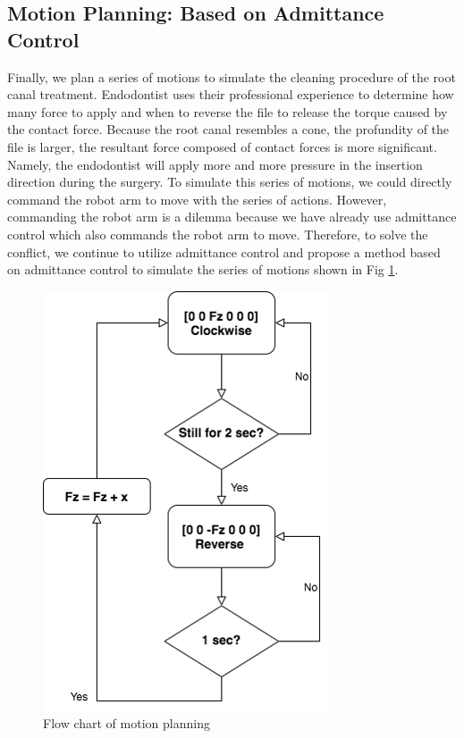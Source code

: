 \subsection{Motion Planning: Based on Admittance Control}
\label{sec:motion planning} 
Finally, we plan a series of motions to simulate the cleaning procedure of the root canal treatment. Endodontist uses their professional experience to determine how many force to apply and when to reverse the file to release the torque caused by the contact force. Because the root canal resembles a cone, the profundity of the file is larger, the resultant force composed of contact forces is more significant. Namely, the endodontist will apply more and more pressure in the insertion direction during the surgery. To simulate this series of motions, we could directly command the robot arm to move with the series of actions. However, commanding the robot arm is a dilemma because we have already use admittance control which also commands the robot arm to move. Therefore,  to solve the conflict, we continue to utilize admittance control and propose a method based on admittance control to simulate the series of motions shown in Fig \ref{fig:motion planning_flow chart}.
\begin{figure}[htbp]
\begin{center}
\includegraphics[width=0.5\linewidth]{Images/motion planning_flow chart.png}
\caption{
Flow chart of motion planning
}\label{fig:motion planning_flow chart}
\end{center}
\end{figure}
